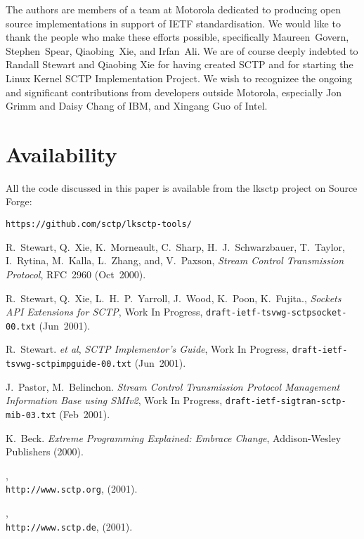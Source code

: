 \documentclass[twocolumn]{article}
\begin{document}
The authors are members of a team at Motorola dedicated to producing
open source implementations in support of IETF standardisation.  We
would like to thank the people who make these efforts possible,
specifically Maureen~Govern, Stephen~Spear, Qiaobing~Xie, and
Irfan~Ali.  We are of course deeply indebted to Randall Stewart and
Qiaobing Xie for having created SCTP and for starting the Linux Kernel
SCTP Implementation Project.  We wish to recognizee the ongoing and
significant contributions from developers outside Motorola, especially
Jon Grimm and Daisy Chang of IBM, and Xingang Guo of Intel.

\section{Availability}

All the code discussed in this paper is available from the lksctp
project on Source Forge:

\begin{center}
\texttt{https://github.com/sctp/lksctp-tools/}
\end{center}

\begin{thebibliography}{2001}

 R.~Stewart, Q.~Xie, K.~Morneault, C.~Sharp,
H.~J.~Schwarzbauer, T.~Taylor, I.~Rytina, M.~Kalla, L.~Zhang, and,
V.~Paxson, {\em Stream Control Transmission Protocol}, RFC~2960 (Oct~2000).

 R.~Stewart, Q.~Xie, L.~H.~P.~Yarroll, J.~Wood,
K.~Poon, K.~Fujita., {\em Sockets API Extensions for SCTP}, Work In
Progress, \texttt{draft-ietf-tsvwg-sctpsocket-00.txt} (Jun~2001).

 R.~Stewart. {\it et al}, 
{\em SCTP Implementor's Guide}, Work In Progress,
\texttt{draft-ietf-tsvwg-sctpimpguide-00.txt} (Jun~2001).

 J.~Pastor, M.~Belinchon. {\em Stream Control
Transmission Protocol Management Information Base using SMIv2}, Work
In Progress, \texttt{draft-ietf-sigtran-sctp-mib-03.txt} (Feb~2001).

 K.~Beck. {\em Extreme Programming Explained: Embrace
Change}, Addison-Wesley Publishers (2000).

,\\
\texttt{http://www.sctp.org}, (2001).

,\\
\texttt{http://www.sctp.de}, (2001).

\end{thebibliography}
\end{document}
